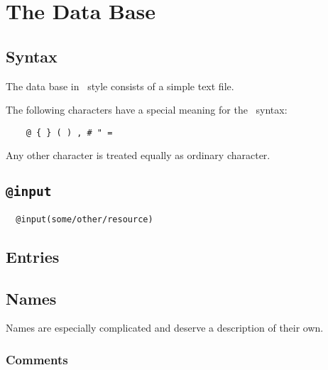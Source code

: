
\chapter{The Data Base}


\section{Syntax}

The data base in \BibTeX\ style consists of a simple text file.

The following characters have a special meaning for the \BibTeX\
syntax:
\begin{verbatim}
    @ { } ( ) , # " =
\end{verbatim}
Any other character is treated equally as ordinary character.

\INCOMPLETE


\section{\texttt{@input}}

\begin{verbatim}
  @input(some/other/resource)
\end{verbatim}

\INCOMPLETE

\section{Entries}

\INCOMPLETE

\section{Names}

Names are especially complicated and deserve a description of their
own.

\INCOMPLETE


\subsection{Comments}


